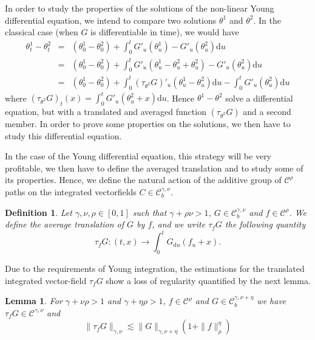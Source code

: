 \documentclass[a4paper,11pt]{article}
\newcommand{\mathd}{\mathrm{d}}
\newtheorem{definition}[theorem]{Definition}
\newtheorem{lemma}[theorem]{Lemma}
\newcommand{\CC}{\mathscr C}
\begin{document}
In order to study the properties of the solutions of the non-linear Young
differential equation, we intend to compare two solutions $\theta^{1}$ and
$\theta^{2}$. In the classical case (when $G$ is differentiable in time), we
would have
\begin{eqnarray*}
  \theta^{1}_{t} - \theta^{2}_{t} & = & ( \theta^{1}_{0} - \theta^{2}_{0} ) +
  \int_{0}^{t} G'_{u} ( \theta^{1}_{u} ) -G'_{u} ( \theta^{2}_{u} ) \mathd u\\
  & = & ( \theta^{1}_{0} - \theta^{2}_{0} ) + \int_{0}^{t} G'_{u} (
  \theta^{1}_{u} - \theta^{2}_{u} + \theta^{2}_{u} ) -G'_{u} ( \theta^{2}_{u}
  ) \mathd u\\
  & = & ( \theta^{1}_{0} - \theta^{2}_{0} ) + \int_{0}^{t} (
  \tau_{\theta^{2}} G )'_{u} ( \theta^{1}_{u} - \theta^{2}_{u} ) \mathd u-
  \int_{0}^{t} G'_{u} ( \theta^{2}_{u} ) \mathd u
\end{eqnarray*}
where $( \tau_{\theta^{2}} G )_{t} ( x ) = \int_{0}^{t} G'_{u} (
\theta^{2}_{u} +x ) \mathd u$. Hence $\theta^{1} - \theta^{2}$ solve a
differential equation, but with a translated and averaged function $(
\tau_{\theta^{2}} G )$ and a second member. In order to prove some properties
on the solutions, we then have to study this differential equation.

In the case of the Young differential equation, this strategy will be very
profitable, we then have to define the averaged translation and to study some
of its properties. Hence, we define the natural action of the additive group
of $\CC^{\rho}$ paths on the integrated vectorfields $C \in \CC^{\gamma ,
\nu}_{b}$.

\begin{definition}
  Let $\gamma , \nu , \rho \in [ 0,1 ]$ such that $\gamma + \rho \nu >1$, $G
  \in \CC_{b}^{\gamma , \nu}$ and $f \in \CC^{\rho}$. We define the average
  translation of $G$ by $f$, and we write $\tau_{f} G$ the following quantity
  \[ \tau_{f} G: ( t,x ) \rightarrow \int_{0}^{t} G_{\mathd u} ( f_{u} +x ) .
  \]
\end{definition}

Due to the requirements of Young integration, the estimations for the
translated integrated vector-field $\tau_{f} G$ show a loss of regularity
quantified by the next lemma.

\begin{lemma}
  \label{lemma:translation}For $\gamma + \nu \rho >1$ and $\gamma + \eta \rho
  >1$, $f \in \CC^{\rho}$ and $G \in \CC_{b}^{\gamma , \nu + \eta}$ we have
  $\tau_{f} G \in \CC^{\gamma , \nu}$ and
  \[ \| \tau_{f} G \|_{\gamma , \nu} \lesssim \| G \|_{\gamma , \nu + \eta} (
     1+ \| f \|^{\eta}_{\rho} ) \]
\end{lemma}
\end{document}
